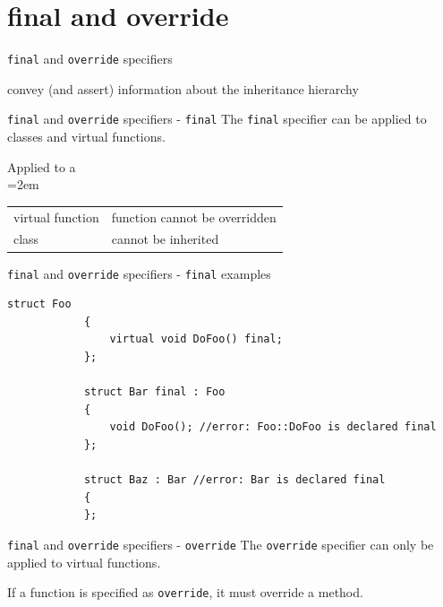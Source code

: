 	\section{\ttfamily final and \ttfamily override}
	\begin{frame}
		\begin{center}
			{\Huge \lstinline[basicstyle=\Huge\ttfamily]|final| and \lstinline[basicstyle=\Huge\ttfamily]|override| specifiers}
			
			\emptyline
			{\Large convey (and assert) information about the inheritance hierarchy}
		\end{center}
	\end{frame}
	
	\begin{frame}{\lstinline|final| and \lstinline|override| specifiers - \lstinline|final|}
		The \lstinline|final| specifier can be applied to classes and virtual functions.
		
		\emptyline
		Applied to a \\
		\leftskip=2em
		\begin{tabular}{l@{ \rarrow}l}
			virtual function & function cannot be overridden \\
			class            & cannot be inherited
		\end{tabular}
		
		\leftskip=0pt
	\end{frame}
	
	\begin{frame}[fragile=singleslide]{\lstinline|final| and \lstinline|override| specifiers - \lstinline|final| examples}
		\begin{lstlisting}[gobble=12]
			struct Foo
			{
			    virtual void DoFoo() final;
			};
			
			struct Bar final : Foo
			{
			    void DoFoo(); //error: Foo::DoFoo is declared final
			};
			
			struct Baz : Bar //error: Bar is declared final
			{
			};
		\end{lstlisting}
	\end{frame}
	
	\begin{frame}{\lstinline|final| and \lstinline|override| specifiers - \lstinline|override|}
		The \lstinline|override| specifier can only be applied to virtual functions.
		
		\emptyline
		If a function is specified as \lstinline|override|, it must override a method.
	\end{frame}
	
